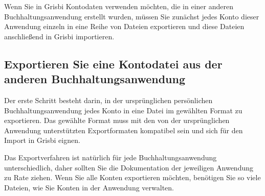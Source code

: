 Wenn Sie in Grisbi Kontodaten verwenden möchten, die in einer anderen Buchhaltungsanwendung erstellt wurden, müssen Sie zunächst jedes Konto dieser Anwendung einzeln in eine Reihe von Dateien exportieren und diese Dateien anschließend in Grisbi importieren.

\subsection{Exportieren Sie eine Kontodatei aus der anderen Buchhaltungsanwendung\label{importexport-import-exportinit}}

Der erste Schritt besteht darin, in der ursprünglichen persönlichen Buchhaltungsanwendung jedes Konto in eine Datei im gewählten Format zu exportieren. Das gewählte Format muss mit den von der ursprünglichen Anwendung unterstützten Exportformaten kompatibel sein und sich für den Import in Grisbi eignen.

Das Exportverfahren ist natürlich für jede Buchhaltungsanwendung unterschiedlich, daher sollten Sie die Dokumentation der jeweiligen Anwendung zu Rate ziehen. Wenn Sie alle Konten exportieren möchten, benötigen Sie so viele Dateien, wie Sie Konten in der Anwendung verwalten.


